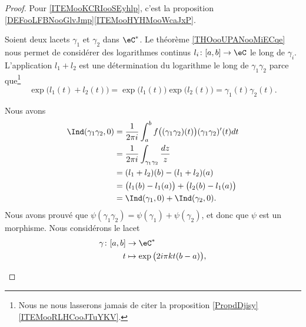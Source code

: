 \begin{proof}
	Pour \ref{ITEMooKCRIooSEyhlp}, c'est la proposition \ref{DEFooLFBNooGlvJmp}\ref{ITEMooHYHMooWcaJxP}.

	Soient deux lacets \( \gamma_1\) et \( \gamma_2\) dans \( \eC^*\). Le théorème \ref{THOooUPANooMiECqe} nous permet de considérer des logarithmes continus \( l_i\colon \mathopen[ a , b \mathclose]\to \eC\) le long de \( \gamma_i\). L'application \( l_1+l_2\) est une détermination du logarithme le long de \( \gamma_1\gamma_2\) parce que\footnote{Nous ne nous lasserons jamais de citer la proposition \ref{PropdDjisy}\ref{ITEMooRLHCooJTuYKV}.}
	\begin{equation}
		\exp\big( l_1(t)+l_2(t) \big)=\exp\big( l_1(t) \big)\exp\big( l_2(t) \big)=\gamma_1(t)\gamma_2(t).
	\end{equation}
	\begin{subproof}
		\spitem[Morphisme]
		Nous avons
		\begin{subequations}
			\begin{align}
				\Ind(\gamma_1\gamma_2,0) & =\frac{1}{ 2\pi i }\int_a^bf\big( (\gamma_1\gamma_2)(t)\big)(\gamma_1\gamma_2)'(t)dt \\
				                         & =\frac{1}{ 2\pi i }\int_{\gamma_1\gamma_2}\frac{ dz }{ z }                           \\
				                         & =(l_1+l_2)(b)-(l_1+l_2)(a)                                                           \\
				                         & =\big( l_1(b)-l_1(a) \big)+\big( l_2(b)-l_1(a) \big)                                 \\
				                         & =\Ind(\gamma_1,0)+\Ind(\gamma_2,0).
			\end{align}
		\end{subequations}
		Nous avons prouvé que \( \psi(\gamma_1\gamma_2)=\psi(\gamma_1)+\psi(\gamma_2)\), et donc que \( \psi\) est un morphisme.
		\spitem[Surjection]
		Nous considérons le lacet
		\begin{equation}
			\begin{aligned}
				\gamma\colon \mathopen[ a , b \mathclose] & \to \eC^*                              \\
				t                                         & \mapsto \exp\big( 2i\pi kt(b-a) \big),
			\end{aligned}

\end{equation}
\end{subproof}
\end{proof}

